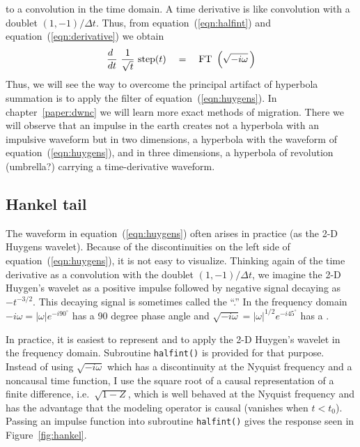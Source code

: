 to a convolution in the time domain.
A time derivative is like convolution with a doublet $(1,-1)/\Delta t$.
Thus, from
equation~(\ref{eqn:halfint}) and 
equation~(\ref{eqn:derivative})
we obtain
\begin{equation}
\label{eqn:huygens}
{d \ \over dt} \ {1\over \sqrt{t}} \ {\rm step}(t) \quad =\quad
{\rm FT}\ \left(  \sqrt{-i\omega} \,\right) 
\end{equation}
Thus, we will see the way to overcome
the principal artifact of hyperbola summation
is to apply the filter of equation~(\ref{eqn:huygens}).
In chapter~\ref{paper:dwnc}
we will learn more exact methods of migration.
There we will observe that an impulse in the earth
creates not a hyperbola with an impulsive waveform
but in two dimensions,
a hyperbola with the waveform of
equation~(\ref{eqn:huygens}),
and in three dimensions,
a hyperbola of revolution (umbrella?)
carrying a time-derivative waveform.

\subsection{Hankel tail}
\par
The waveform in equation~(\ref{eqn:huygens}) often arises in practice
(as the 2-D Huygens wavelet).
Because of the discontinuities on the left side of equation~(\ref{eqn:huygens}),
it is not easy to visualize.
Thinking again of the time derivative
as a convolution with the doublet $(1,-1)/\Delta t$,
we imagine the 2-D Huygen's wavelet as a positive impulse followed
by negative signal decaying as $-t^{-3/2}$.
This decaying signal is sometimes called the ``.''
In the frequency domain
$-i\omega= |\omega |e ^ {-i90^\circ}$
has a 90 degree phase angle and 
$\sqrt{-i\omega}= |\omega |^{1/2} e ^ {-i45^\circ}$
has a .


\par
In practice, it is easiest to represent
and to apply the 2-D Huygen's wavelet in the frequency domain.
Subroutine \texttt{halfint()}  is provided for that purpose.
Instead of using $\sqrt{-i\omega}$ which
has a discontinuity at the Nyquist frequency
and a noncausal time function,
I use the square root of a causal representation
of a finite difference, i.e.~$\sqrt{1-Z}$,
which is well behaved at the Nyquist frequency
and has the advantage that the modeling operator is causal
(vanishes when $t<t_0$).
Passing an impulse function into subroutine {\tt halfint()}
gives the response seen in Figure~\ref{fig:hankel}.

